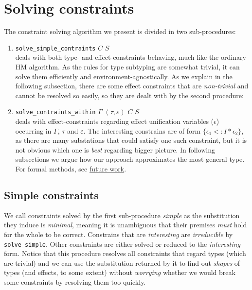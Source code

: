 \documentclass[declaration,shortabstract]{iithesis}
\theoremstyle{definition} \newtheorem{definition}{Definition}[section]
\begin{document}
\section{Solving constraints}
The constraint solving algorithm we present is divided in two sub-procedures:
\begin{enumerate}
    \item \texttt{solve\_simple\_contraints} $C$ $S$\\
    deals with both type- and effect-constraints behaving, much like the ordinary HM algorithm.
    As the rules for type subtyping are somewhat trivial, it can solve them efficiently and environment-agnostically. As we explain in the following subsection, there are some effect constraints that are \textit{non-trivial} and cannot be resolved so easily, so they are dealt with by the second procedure:
    
    \item \texttt{solve\_contraints\_within} $\Gamma$ $(\tau, \varepsilon)$ $C$ $S$ \\
    deals with effect-constraints regarding effect unification variables ($\epsilon$) occurring in $\Gamma$, $\tau$ and $\varepsilon$.
    The interesting constrains are of form $\{\epsilon_1 <: I * \epsilon_2\}$,
    as there are many substations that could satisfy one such constraint, but it is not obvious which one is \textit{best} regarding bigger picture.
    In following subsections we argue how our approach approximates the most general type.
    For formal methods, see \hyperlink{chapter.6}{future work}.
\end{enumerate}

\subsection{Simple constraints}
We call constraints solved by the first sub-procedure \textit{simple} as the substitution they induce is \textit{minimal},
meaning it is unambiguous that their premises \textit{must} hold for the whole to be correct. Constrains that are \textit{interesting} are \textit{irreducible} by \texttt{solve\_simple}.
Other constraints are either solved or reduced to the \textit{interesting} form.
Notice that this procedure resolves all constraints that regard types (which are trivial)
and we can use the substitution returned by it
to find out \textit{shapes} of types (and effects, to some extent) without \textit{worrying} whether we would break
some constraints by resolving them too quickly.
\end{document}
